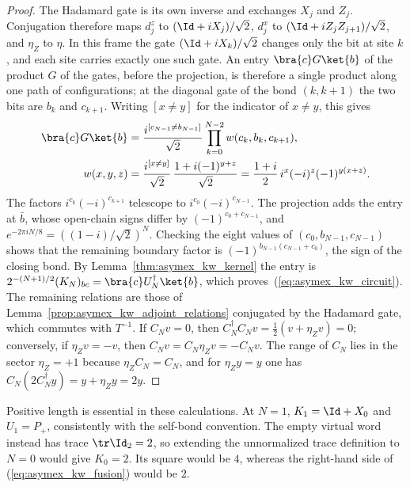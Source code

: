 \begin{proof}
    \leanok
    The Hadamard gate is its own inverse and exchanges $X_j$ and $Z_j$.
    Conjugation therefore maps $d^z_j$ to $(\Id+iX_j)/\sqrt2$, $d^x_j$ to
    $(\Id+iZ_jZ_{j+1})/\sqrt2$, and $\eta_Z$ to $\eta$. In this frame
    the gate $(\Id+iX_k)/\sqrt2$ changes only the bit at site $k$, and
    each site carries exactly one such gate. An entry $\bra{c}G\ket{b}$
    of the product $G$ of the gates, before the projection, is therefore
    a single product along one path of configurations; at the diagonal
    gate of the bond $(k,k+1)$ the two bits are $b_k$ and $c_{k+1}$.
    Writing $[x\neq y]$ for the indicator of $x\neq y$, this gives
    \begin{align}
        \bra{c}G\ket{b}
         & =\frac{i^{[c_{N-1}\neq b_{N-1}]}}{\sqrt2}
        \prod_{k=0}^{N-2}w(c_k,b_k,c_{k+1}),
        \notag                                       \\
        w(x,y,z)
         & =\frac{i^{[x\neq y]}}{\sqrt2}\,
        \frac{1+i(-1)^{y+z}}{\sqrt2}
        =\frac{1+i}{2}\,i^x(-i)^z(-1)^{y(x+z)}.
        \notag
    \end{align}
    The factors $i^{c_k}(-i)^{c_{k+1}}$ telescope to
    $i^{c_0}(-i)^{c_{N-1}}$. The projection adds the entry at $\bar b$,
    whose open-chain signs differ by $(-1)^{c_0+c_{N-1}}$, and
    $e^{-2\pi iN/8}=((1-i)/\sqrt2)^N$. Checking the eight values of
    $(c_0,b_{N-1},c_{N-1})$ shows that the remaining boundary factor is
    $(-1)^{b_{N-1}(c_{N-1}+c_0)}$, the sign of the closing bond. By
    Lemma~\ref{thm:asymex_kw_kernel} the entry is
    $2^{-(N+1)/2}(K_N)_{bc}=\bra{c}U_N^\dagger\ket{b}$, which
    proves~(\ref{eq:asymex_kw_circuit}). The remaining relations are
    those of Lemma~\ref{prop:asymex_kw_adjoint_relations}
    conjugated by the Hadamard gate, which commutes with $T^{-1}$.
    If $C_Nv=0$, then $C_N^\dagger C_Nv=\tfrac12(v+\eta_Zv)=0$;
    conversely, if $\eta_Zv=-v$, then $C_Nv=C_N\eta_Zv=-C_Nv$. The range
    of $C_N$ lies in the sector $\eta_Z=+1$ because $\eta_ZC_N=C_N$, and
    for $\eta_Zy=y$ one has $C_N(2C_N^\dagger y)=y+\eta_Zy=2y$.
\end{proof}

Positive length is essential in these calculations. At $N=1$,
$K_1=\Id+X_0$ and $U_1=P_+$, consistently with the self-bond convention.
The empty virtual word instead has trace $\tr\Id_2=2$, so extending
the unnormalized trace definition to $N=0$ would give $K_0=2$. Its square
would be $4$, whereas the right-hand side of
(\ref{eq:asymex_kw_fusion}) would be $2$.

